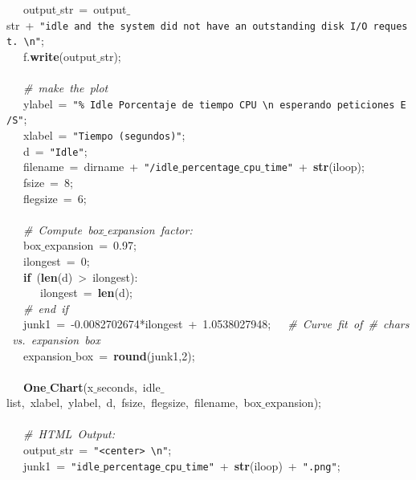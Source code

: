 \mbox{}\ \ \ output$\_$str\ =\ output$\_$str\ +\ \texttt{"{}idle\ and\ the\ system\ did\ not\ have\ an\ outstanding\ disk\ I/O\ request.\ \textbackslash{}n"{}}; \\
\mbox{}\ \ \ f.\textbf{write}(output$\_$str); \\
\mbox{}\ \ \  \\
\mbox{}\ \ \ \textit{\#\ make\ the\ plot} \\
\mbox{}\ \ \ ylabel\ =\ \texttt{"{}\%\ Idle\ Porcentaje\ de\ tiempo\ CPU\ \textbackslash{}n\ esperando\ peticiones\ E/S"{}}; \\
\mbox{}\ \ \ xlabel\ =\ \texttt{"{}Tiempo\ (segundos)"{}}; \\
\mbox{}\ \ \ d\ =\ \texttt{"{}Idle"{}}; \\
\mbox{}\ \ \ filename\ =\ dirname\ +\ \texttt{"{}/idle$\_$percentage$\_$cpu$\_$time"{}}\ +\ \textbf{str}(iloop); \\
\mbox{}\ \ \ fsize\ =\ 8; \\
\mbox{}\ \ \ flegsize\ =\ 6; \\
\mbox{}\ \ \  \\
\mbox{}\ \ \ \textit{\#\ Compute\ box$\_$expansion\ factor:} \\
\mbox{}\ \ \ box$\_$expansion\ =\ 0.97; \\
\mbox{}\ \ \ ilongest\ =\ 0; \\
\mbox{}\ \ \ \textbf{if}\ (\textbf{len}(d)\ \textgreater{}\ ilongest): \\
\mbox{}\ \ \ \ \ \ ilongest\ =\ \textbf{len}(d); \\
\mbox{}\ \ \ \textit{\#\ end\ if} \\
\mbox{}\ \ \ junk1\ =\ -0.0082702674*ilongest\ +\ 1.0538027948;\ \ \ \textit{\#\ Curve\ fit\ of\ \#\ chars\ vs.\ expansion\ box} \\
\mbox{}\ \ \ expansion$\_$box\ =\ \textbf{round}(junk1,2); \\
\mbox{}\ \ \  \\
\mbox{}\ \ \ \textbf{One$\_$Chart}(x$\_$seconds,\ idle$\_$list,\ xlabel,\ ylabel,\ d,\ fsize,\ flegsize,\ filename,\ box$\_$expansion); \\
\mbox{}\ \ \  \\
\mbox{}\ \ \ \textit{\#\ HTML\ Output:} \\
\mbox{}\ \ \ output$\_$str\ =\ \texttt{"{}\textless{}center\textgreater{}\ \textbackslash{}n"{}}; \\
\mbox{}\ \ \ junk1\ =\ \texttt{"{}idle$\_$percentage$\_$cpu$\_$time"{}}\ +\ \textbf{str}(iloop)\ +\ \texttt{"{}.png"{}}; \\
